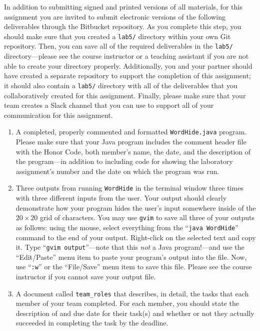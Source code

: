 In addition to submitting signed and printed versions of all materials, for this assignment you are invited to submit
electronic versions of the following deliverables through the Bitbucket repository. As you complete this step, you
should make sure that you created a {\tt lab5/} directory within your own Git repository.  Then, you can save all of the
required deliverables in the {\tt lab5/} directory---please see the course instructor or a teaching assistant if you are
not able to create your directory properly. Additionally, you and your partner should have created a separate repository
to support the completion of this assignment; it should also contain a {\tt lab5/} directory with all of the
deliverables that you collaboratively created for this assignment. Finally, please make sure that your team creates a
Slack channel that you can use to support all of your communication for this assignment.

\begin{enumerate}

        \item A completed, properly commented and formatted {\tt WordHide.java} program. Please make sure that your Java
          program includes the comment header file with the Honor Code, both member's name, the date, and the
          description of the program---in addition to including code for showing the laboratory assignment's number and
          the date on which the program was run.

        \item Three outputs from running {\tt WordHide} in the terminal window three times with three different inputs
          from the user. Your output should clearly demonstrate how your program hides the user's input somewhere inside
          of the $20 \times 20$ grid of characters.  You may use {\tt gvim} to save all three of your outputs as
          follows: using the mouse, select everything from the ``{\tt java WordHide}'' command to the end of your
          output.  Right-click on the selected text and copy it.  Type ``{\tt gvim output}''---note that this {\em not}
          a Java program!---and use the ``Edit/Paste'' menu item to paste your program's output into the file.  Now, use
          ``{\tt :w}'' or the ``File/Save'' menu item to save this file. Please see the course instructor if you cannot
          save your output file.

        \item A document called {\tt team\_roles} that describes, in detail, the tasks that each member of your team
          completed. For each member, you should state the description of and due date for their task(s) and whether or
          not they actually succeeded in completing the task by the deadline.

\end{enumerate}

